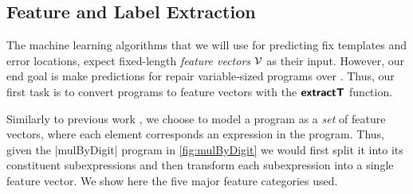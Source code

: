 


\subsection{Feature and Label Extraction}
\label{subsec:extract}
The machine learning algorithms that we will use for predicting fix templates
and error locations, expect fixed-length \emph{feature vectors} $\mathcal{V}$ as their
input. However, our end goal is make predictions for repair variable-sized
programs over \lang. Thus, our first task is to convert programs to feature
vectors with the $\bm{\mathsf{extractT}}$ function.

Similarly to previous work \citep{Seidel:2017}, we choose to model a program as
a \emph{set} of feature vectors, where each element corresponds an expression in
the program. Thus, given the |mulByDigit| program in \autoref{fig:mulByDigit} we
would first split it into its constituent subexpressions and then transform each
subexpression into a single feature vector. We show here the five major feature
categories used.

